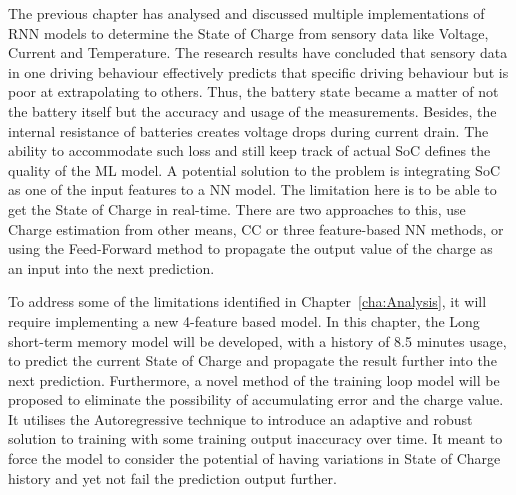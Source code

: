 
%
%
The previous chapter has analysed and discussed multiple implementations of RNN models to determine the State of Charge from sensory data like Voltage, Current and Temperature.
The research results have concluded that sensory data in one driving behaviour effectively predicts that specific driving behaviour but is poor at extrapolating to others.
Thus, the battery state became a matter of not the battery itself but the accuracy and usage of the measurements.
Besides, the internal resistance of batteries creates voltage drops during current drain.
The ability to accommodate such loss and still keep track of actual SoC defines the quality of the ML model.
A potential solution to the problem is integrating SoC as one of the input features to a NN model.
The limitation here is to be able to get the State of Charge in real-time.
There are two approaches to this, use Charge estimation from other means, CC or three feature-based NN methods, or using the Feed-Forward method to propagate the output value of the charge as an input into the next prediction.

%
%
To address some of the limitations identified in Chapter~\ref{cha:Analysis}, it will require implementing a new 4-feature based model.
In this chapter, the Long short-term memory model will be developed, with a history of 8.5 minutes usage, to predict the current State of Charge and propagate the result further into the next prediction.
Furthermore, a novel method of the training loop model will be proposed to eliminate the possibility of accumulating error and the charge value.
It utilises the Autoregressive technique to introduce an adaptive and robust solution to training with some training output inaccuracy over time.
It meant to force the model to consider the potential of having variations in State of Charge history and yet not fail the prediction output further.


